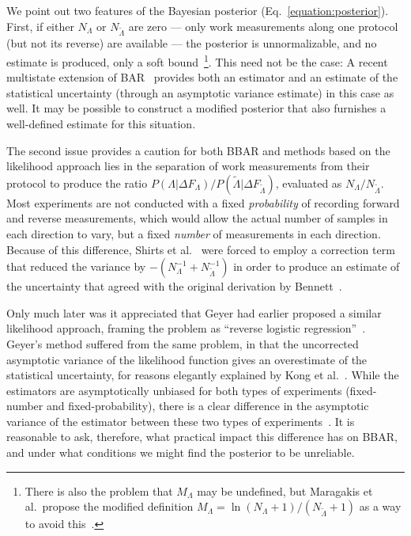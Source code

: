 \documentclass[aps,pre,twocolumn,superscriptaddress,nofootinbib]{revtex4}
\begin{document}
We point out two features of the Bayesian posterior (Eq.~\ref{equation:posterior}).
First, if either $N_\Lambda$ or $N_{\tilde{\Lambda}}$ are zero --- only work measurements along one protocol (but not its reverse) are available --- the posterior is unnormalizable, and no estimate is produced, only a soft bound~\footnote{There is also the problem that $M_\Lambda$ may be undefined, but Maragakis et al.~propose the modified definition $M_\Lambda = \ln (N_\Lambda + 1) / (N_{\tilde{\Lambda}} + 1)$ as a way to avoid this~\cite{maragakis:jcp:2008:bayesian-bar}.}.
This need not be the case: A recent multistate extension of BAR~\cite{shirts:jcp:2008:mbar} provides both an estimator and an estimate of the statistical uncertainty (through an asymptotic variance estimate) in this case as well.
It may be possible to construct a modified posterior that also furnishes a well-defined estimate for this situation.

The second issue provides a caution for both BBAR and methods based on the likelihood approach lies in the separation of work measurements from their protocol to produce the ratio $P(\Lambda | \Delta F_\Lambda) / P(\tilde{\Lambda} | \Delta F_{\tilde{\Lambda}})$, evaluated as $N_\Lambda / N_{\tilde{\Lambda}}$.
Most experiments are not conducted with a fixed \emph{probability} of recording forward and reverse measurements, which would allow the actual number of samples in each direction to vary, but a fixed \emph{number} of measurements in each direction.
Because of this difference, Shirts et al.~\cite{shirts:prl:2003:bar} were forced to employ a correction term~\cite{anderson.biometrika:1972:logistic-discrimination} that reduced the variance by $- (N_{\Lambda}^{-1} + N_{\tilde{\Lambda}}^{-1})$ in order to produce an estimate of the uncertainty that agreed with the original derivation by Bennett~\cite{bennett:j-comput-phys:1976:bar}.

Only much later was it appreciated that Geyer had earlier proposed a similar likelihood approach, framing the problem as ``reverse logistic regression''~\cite{geyer:techrep:1994:reverse-logistic-regression}.
Geyer's method suffered from the same problem, in that the uncorrected asymptotic variance of the likelihood function gives an overestimate of the statistical uncertainty, for reasons elegantly explained by Kong et al.~\cite{kong:j-r-stat-soc-b:2003:bridge-sampling}.
While the estimators are asymptotically unbiased for both types of experiments (fixed-number and fixed-probability), there is a clear difference in the asymptotic variance of the estimator between these two types of experiments~\cite{kong:j-r-stat-soc-b:2003:bridge-sampling}.
It is reasonable to ask, therefore, what practical impact this difference has on BBAR, and under what conditions we might find the posterior to be unreliable.
\end{document}
